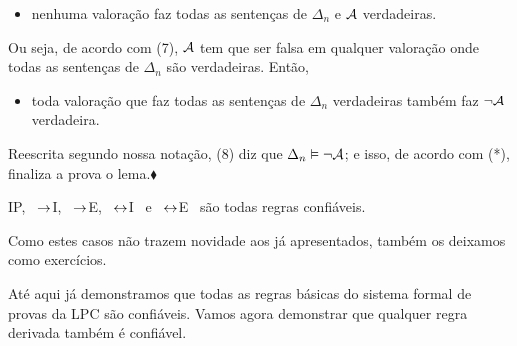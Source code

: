 \begin{itemize}
	\item[(7)] nenhuma valoração faz todas as sentenças de $\Delta_n$ e $\mathcal{A}$ verdadeiras.
\end{itemize}
Ou seja, de acordo com (7), $\mathcal{A}$ tem que ser falsa em qualquer valoração onde todas as sentenças de $\Delta_n$ são verdadeiras. Então, 
\begin{itemize}
	\item[(8)] toda valoração que faz todas as sentenças de $\Delta_n$ verdadeiras também faz $\neg\mathcal{A}$ verdadeira.
\end{itemize}
Reescrita segundo nossa notação, (8) diz que $\Delta_n \vDash \neg\mathcal{A}$; e isso, de acordo com (*), finaliza a prova o lema.$\blacklozenge$

%

\begin{factoidboxe}\label{lem:LastRuleSound} IP, \ $\rightarrow$I, \ $\rightarrow$E, \ $\leftrightarrow$I \ e \ $\leftrightarrow$E \ são todas regras confiáveis.
\end{factoidboxe}

Como estes casos não trazem novidade aos já apresentados, também os deixamos como exercícios.

Até aqui já demonstramos que todas as regras básicas do sistema formal de provas da LPC são confiáveis.
Vamos agora demonstrar que qualquer regra derivada também é confiável.

